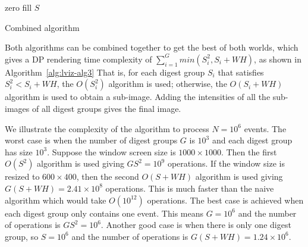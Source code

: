 \begin{algorithm}[htb]
\BlankLine
zero fill $S$\;
\caption{Combined algorithm}
\label{alg:lviz-alg3}
\end{algorithm}

Both algorithms can be combined together to
get the best of both worlds, which gives
a DP rendering time complexity of $\sum_{i=1}^{G} min(S_i^2, S_i + W H)$,
as shown in Algorithm~\ref{alg:lviz-alg3}
That is, for each digest group $S_i$ that satisfies $S_i^2 < S_i+W H$, 
the $O(S_i^2)$ algorithm is used;
otherwise, the $O(S_i + W H)$ algorithm is used to obtain a sub-image.
Adding the intensities of all the sub-images of all digest groups gives the final image.

We illustrate the complexity of the algorithm to process $N=10^6$ events.
The worst case is when the number of digest groups $G$ is $10^3$
and each digest group has size $10^3$.
Suppose the window screen size is $1000\times 1000$.
Then the first $O(S^2)$ algorithm is used giving $GS^2 = 10^9$ operations.
If the window size is resized to $600\times 400$, then
the second $O(S+W H)$ algorithm is used giving $G(S+WH)=2.41\times 10^8$ operations.
This is much faster than the naive algorithm which would take $O(10^{12})$
operations.
The best case is achieved when each digest group only contains one event.
This means $G = 10^6$ and the number of operations
is $G S^2=10^6$.
Another good case is when there is only one digest group,
so $S=10^6$ and the number of operations is $G(S + WH)=1.24\times10^6$.

